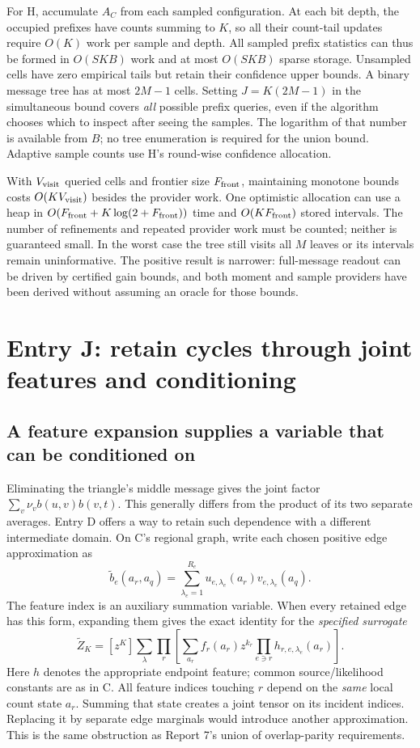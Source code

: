 \documentclass[10pt,a4paper]{article}
\begin{document}
For H, accumulate $A_C$ from each sampled configuration. At each bit depth, the occupied prefixes have
counts summing to $K$, so all their count-tail updates require $O(K)$ work per sample and depth.
All sampled prefix statistics can thus be formed in $O(SKB)$ work and at most $O(SKB)$ sparse storage.
Unsampled cells have zero empirical tails but retain their confidence upper bounds.
A binary message tree has at most $2M-1$ cells. Setting $J=K(2M-1)$ in the simultaneous bound covers
\emph{all} possible prefix queries, even if the algorithm chooses which to inspect after seeing the samples.
The logarithm of that number is available from $B$; no tree enumeration is required for the union bound.
Adaptive sample counts use H's round-wise confidence allocation.

With $V_{\rm visit}$ queried cells and frontier size $F_{\rm front}$, maintaining monotone bounds costs
$O(KV_{\rm visit})$ besides the provider work. One optimistic allocation can use a heap in
$O(F_{\rm front}+K\log(2+F_{\rm front}))$ time and $O(KF_{\rm front})$ stored intervals.
The number of refinements and repeated provider work must be counted; neither is guaranteed small.
In the worst case the tree still visits all $M$ leaves or its intervals remain uninformative.
The positive result is narrower: full-message readout can be driven by certified gain bounds, and both
moment and sample providers have been derived without assuming an oracle for those bounds.

\clearpage
\section{Entry J: retain cycles through joint features and conditioning}
\label{sec:cyclic-features}
\subsection{A feature expansion supplies a variable that can be conditioned on}
Eliminating the triangle's middle message gives the joint factor $\sum_v\nu_v b(u,v)b(v,t)$.
This generally differs from the product of its two separate averages. Entry D offers a way to retain
such dependence with a different intermediate domain. On C's regional graph, write each chosen positive
edge approximation as
\[
 \widetilde b_e(a_r,a_q)=\sum_{\lambda_e=1}^{R_e}
              u_{e,\lambda_e}(a_r)v_{e,\lambda_e}(a_q).
\]
The feature index is an auxiliary summation variable. When every retained edge has this form, expanding
them gives the exact identity for the \emph{specified surrogate}
\begin{equation}
 \widetilde Z_K=[z^K]\sum_{\lambda}
       \prod_r\left[\sum_{a_r}f_r(a_r)z^{k_r}
                       \prod_{e\ni r}h_{r,e,\lambda_e}(a_r)\right].
 \label{eq:feature-network}
\end{equation}
Here $h$ denotes the appropriate endpoint feature; common source/likelihood constants are as in C.
All feature indices touching $r$ depend on the \emph{same} local count state $a_r$. Summing that state
creates a joint tensor on its incident indices. Replacing it by separate edge marginals would introduce
another approximation. This is the same obstruction as Report 7's union of overlap-parity requirements.
\end{document}
